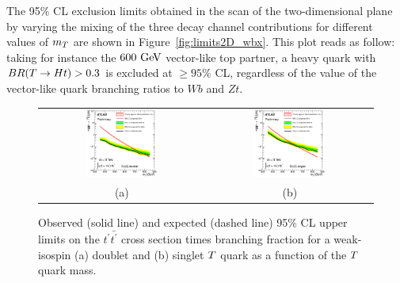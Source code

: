 
The  95\% CL exclusion limits  obtained in the scan of the two-dimensional
plane by varying the mixing of the three decay channel contributions for
different values of $m_{\T}$ are shown in Figure~\ref{fig:limits2D_wbx}. 
This plot reads as follow: taking for instance the $600\gev$ 
vector-like top partner, a heavy quark with
$BR(\T\to Ht)>0.3$ is excluded at $\geq 95\%$ CL,
regardless of the value of the vector-like quark branching ratios to $Wb$ and $Zt$.  



\begin{figure}[htbp]
\begin{center}
\begin{tabular}{cc}
\includegraphics[width=0.45\textwidth]{results/figures/htx/lim_doublet.eps} &
\includegraphics[width=0.45\textwidth]{results/figures/htx/lim_singlet.eps} \\
(a) & (b) \\
\end{tabular}
\caption{Observed (solid line) and expected (dashed line) 95\% CL upper limits on the $t^\prime \bar{t^\prime}$ cross section times branching fraction
for a weak-isospin (a) doublet and (b) singlet $\T$ quark  as a function of the $\T$ quark mass. 
\label{fig:limits1D_htx}}
\end{center}
\end{figure}

